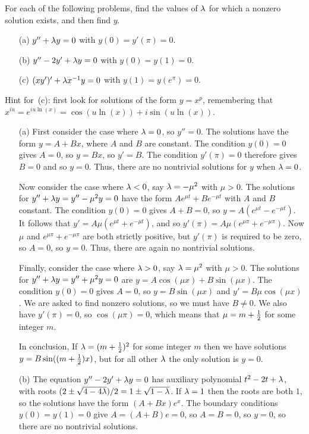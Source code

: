 \documentclass[a4paper]{amsart}
\begin{document}
\begin{exercise}\label{ex-eigenfunctions}
 For each of the following problems, find the values of $\lambda$ for
 which a nonzero solution exists, and then find $y$.
 \begin{itemize}
  \item[(a)] $y''+\lambda y=0$ with $y(0)=y'(\pi)=0$.
  \item[(b)] $y''-2y'+\lambda y=0$ with $y(0)=y(1)=0$.
  \item[(c)] $(xy')'+\lambda x^{-1}y=0$ with $y(1)=y(e^\pi)=0$.
 \end{itemize}
 Hint for~(c): first look for solutions of the form $y=x^p$,
 remembering that $x^{iu}=e^{iu\ln(x)}=\cos(u\ln(x))+i\sin(u\ln(x))$.
\end{exercise}
\begin{solution}\leavevmode
 \begin{itemize}
  \item[(a)] First consider the case where $\lambda=0$, so $y''=0$.  The
   solutions have the form $y=A+Bx$, where $A$ and $B$ are constant.
   The condition $y(0)=0$ gives $A=0$, so $y=Bx$, so $y'=B$.  The
   condition $y'(\pi)=0$ therefore gives $B=0$ and so $y=0$.  Thus,
   there are no nontrivial solutions for $y$ when $\lambda=0$.  

   Now consider the case where $\lambda<0$, say $\lambda=-\mu^2$ with
   $\mu>0$.  The solutions for $y''+\lambda y=y''-\mu^2y=0$ have the form
   $Ae^{\mu t}+Be^{-\mu t}$ with $A$ and $B$ constant.  The condition
   $y(0)=0$ gives $A+B=0$, so $y=A(e^{\mu t}-e^{-\mu t})$. It follows
   that $y'=A\mu(e^{\mu t}+e^{-\mu t})$, and so
   $y'(\pi)=A\mu(e^{\mu\pi}+e^{-\mu\pi})$.  Now $\mu$ and
   $e^{\mu\pi}+e^{-\mu\pi}$ are both strictly positive, but $y'(\pi)$
   is required to be zero, so $A=0$, so $y=0$.  Thus, there are again
   no nontrivial solutions.

   Finally, consider the case where $\lambda>0$, say $\lambda=\mu^2$ with
   $\mu>0$.  The solutions for $y''+\lambda y=y''+\mu^2 y=0$ are
   $y=A\cos(\mu x)+B\sin(\mu x)$.  The condition $y(0)=0$ gives $A=0$,
   so $y=B\sin(\mu x)$ and $y'=B\mu\cos(\mu x)$.  We are asked to find
   nonzero solutions, so we must have $B\neq 0$.  We also have
   $y'(\pi)=0$, so $\cos(\mu\pi)=0$, which means that $\mu=m+\tfrac{1}{2}$
   for some integer $m$.  

   In conclusion, If $\lambda=(m+\tfrac{1}{2})^2$ for some integer $m$ then we
   have solutions $y=B\sin((m+\tfrac{1}{2})x)$, but for all other $\lambda$ the
   only solution is $y=0$.
  \item[(b)] The equation $y''-2y'+\lambda y=0$ has auxiliary polynomial
   $t^2-2t+\lambda$, with roots $(2\pm\sqrt{4-4\lambda})/2=1\pm\sqrt{1-\lambda}$.
   If $\lambda=1$ then the roots are both $1$, so the solutions have the
   form $(A+Bx)e^x$.  The boundary conditions $y(0)=y(1)=0$ give
   $A=(A+B)e=0$, so $A=B=0$, so $y=0$, so there are no nontrivial
   solutions.  


\end{itemize}
\end{solution}
\end{document}
